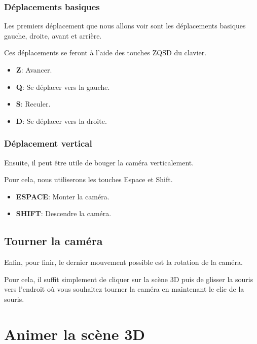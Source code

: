 \documentclass[11pt]{report}
\begin{document}

\subsection{Déplacements basiques}

\hypertarget{move}{Les premiers déplacement que nous allons voir sont les déplacements basiques gauche, droite, avant et arrière.} Ces déplacements se feront à l'aide des touches ZQSD du clavier.

\begin{itemize}
  \item \textbf{Z}: Avancer.
  \item \textbf{Q}: Se déplacer vers la gauche.
  \item \textbf{S}: Reculer.
  \item \textbf{D}: Se déplacer vers la droite.
\end{itemize}

\subsection{Déplacement vertical}

\hypertarget{moveV}{Ensuite, il peut être utile de bouger la caméra verticalement.} Pour cela, nous utiliserons les touches Espace et Shift.

\begin{itemize}
  \item \textbf{ESPACE}: Monter la caméra.
  \item \textbf{SHIFT}: Descendre la caméra.
\end{itemize}

\section{Tourner la caméra}

\hypertarget{rotate}{Enfin, pour finir, le dernier mouvement possible est la rotation de la caméra.} Pour cela, il suffit simplement de cliquer sur la scène 3D puis de glisser la souris vers l'endroit où vous souhaitez tourner la caméra en maintenant le clic de la souris.


\chapter{Animer la scène 3D}
\end{document}

